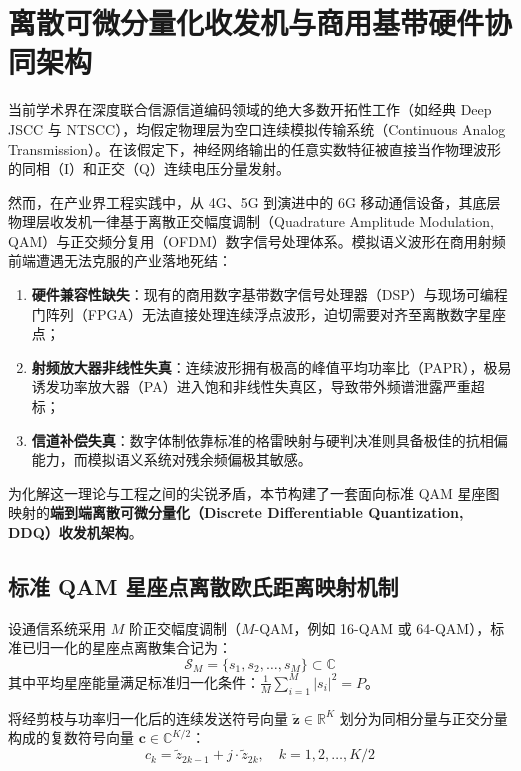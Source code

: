 \section{离散可微分量化收发机与商用基带硬件协同架构}
\label{sec:3_3_differentiable_quantization}

当前学术界在深度联合信源信道编码领域的绝大多数开拓性工作（如经典 Deep JSCC 与 NTSCC），均假定物理层为空口连续模拟传输系统（Continuous Analog Transmission）。在该假定下，神经网络输出的任意实数特征被直接当作物理波形的同相（I）和正交（Q）连续电压分量发射。

然而，在产业界工程实践中，从 4G、5G 到演进中的 6G 移动通信设备，其底层物理层收发机一律基于离散正交幅度调制（Quadrature Amplitude Modulation, QAM）与正交频分复用（OFDM）数字信号处理体系。模拟语义波形在商用射频前端遭遇无法克服的产业落地死结：
\begin{enumerate}
  \item \textbf{硬件兼容性缺失}：现有的商用数字基带数字信号处理器（DSP）与现场可编程门阵列（FPGA）无法直接处理连续浮点波形，迫切需要对齐至离散数字星座点；
  \item \textbf{射频放大器非线性失真}：连续波形拥有极高的峰值平均功率比（PAPR），极易诱发功率放大器（PA）进入饱和非线性失真区，导致带外频谱泄露严重超标；
  \item \textbf{信道补偿失真}：数字体制依靠标准的格雷映射与硬判决准则具备极佳的抗相偏能力，而模拟语义系统对残余频偏极其敏感。
\end{enumerate}

为化解这一理论与工程之间的尖锐矛盾，本节构建了一套面向标准 QAM 星座图映射的\textbf{端到端离散可微分量化（Discrete Differentiable Quantization, DDQ）收发机架构}。

\subsection{标准 QAM 星座点离散欧氏距离映射机制}
设通信系统采用 $M$ 阶正交幅度调制（$M$-QAM，例如 16-QAM 或 64-QAM），标准已归一化的星座点离散集合记为：
\begin{equation}
  \mathcal{S}_M = \{s_1, s_2, \dots, s_M\} \subset \mathbb{C}
  \label{eq:qam_constellation_set}
\end{equation}
其中平均星座能量满足标准归一化条件：$\frac{1}{M} \sum_{i=1}^M |s_i|^2 = P$。

将经剪枝与功率归一化后的连续发送符号向量 $\tilde{\bm{z}} \in \mathbb{R}^K$ 划分为同相分量与正交分量构成的复数符号向量 $\bm{c} \in \mathbb{C}^{K/2}$：
\begin{equation}
  c_k = \tilde{z}_{2k-1} + j \cdot \tilde{z}_{2k}, \quad k = 1, 2, \dots, K/2
  \label{eq:iq_complex_representation}
\end{equation}

